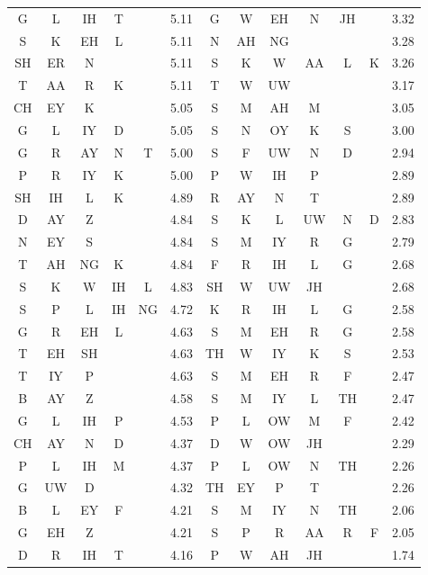 \begin{center}
\begin{longtable}{c@{ } c@{ } c@{ } c@{ } c@{ } c c c c c c c c}
G  & L  & IH & T  &   & 5.11  & G  & W  & EH & N  & JH &   & 3.32 \\
S  & K  & EH & L  &   & 5.11  & N  & AH & NG &    &    &   & 3.28 \\
SH & ER & N  &    &   & 5.11  & S  & K  & W  & AA & L  & K & 3.26 \\
T  & AA & R  & K  &   & 5.11  & T  & W  & UW &    &    &   & 3.17 \\
CH & EY & K  &    &   & 5.05  & S  & M  & AH & M  &    &   & 3.05 \\
G  & L  & IY & D  &   & 5.05  & S  & N  & OY & K  & S  &   & 3.00 \\
G  & R  & AY & N  & T & 5.00  & S  & F  & UW & N  & D  &   & 2.94 \\
P  & R  & IY & K  &   & 5.00  & P  & W  & IH & P  &    &   & 2.89 \\
SH & IH & L  & K  &   & 4.89  & R  & AY & N  & T  &    &   & 2.89 \\
D  & AY & Z  &    &   & 4.84  & S  & K  & L  & UW & N  & D & 2.83 \\
N  & EY & S  &    &   & 4.84  & S  & M  & IY & R  & G  &   & 2.79 \\
T  & AH & NG & K  &   & 4.84  & F  & R  & IH & L  & G  &   & 2.68 \\
S  & K  & W  & IH & L & 4.83  & SH & W  & UW & JH &    &   & 2.68 \\
S  & P  & L  & IH & NG& 4.72  & K  & R  & IH & L  & G  &   & 2.58 \\
G  & R  & EH & L  &   & 4.63  & S  & M  & EH & R  & G  &   & 2.58 \\
T  & EH & SH &    &   & 4.63  & TH & W  & IY & K  & S  &   & 2.53 \\
T  & IY & P  &    &   & 4.63  & S  & M  & EH & R  & F  &   & 2.47 \\
B  & AY & Z  &    &   & 4.58  & S  & M  & IY & L  & TH &   & 2.47 \\
G  & L  & IH & P  &   & 4.53  & P  & L  & OW & M  & F  &   & 2.42 \\
CH & AY & N  & D  &   & 4.37  & D  & W  & OW & JH &    &   & 2.29 \\
P  & L  & IH & M  &   & 4.37  & P  & L  & OW & N  & TH &   & 2.26 \\
G  & UW & D  &    &   & 4.32  & TH & EY & P  & T  &    &   & 2.26 \\
B  & L  & EY & F  &   & 4.21  & S  & M  & IY & N  & TH &   & 2.06 \\
G  & EH & Z  &    &   & 4.21  & S  & P  & R  & AA & R  & F & 2.05 \\
D  & R  & IH & T  &   & 4.16  & P  & W  & AH & JH &    &   & 1.74 \\
\bottomrule
\end{longtable}
\end{center}

